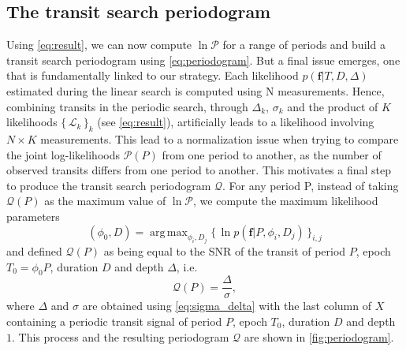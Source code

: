 \documentclass[modern]{aastex631}
\newcommand{\set}[1]{\{\,#1\,\}}
\DeclareMathOperator*{\argmax}{arg\,max}
\begin{document}
\subsection{The transit search periodogram}

Using \autoref{eq:result}, we can now compute $\ln\mathcal{P}$ for a range of periods and build a transit search periodogram using \autoref{eq:periodogram}. But a final issue emerges, one that is fundamentally linked to our strategy. Each likelihood $p(\bm{f} \vert T, D, \Delta)$ estimated during the linear search is computed using N measurements. Hence, combining transits in the periodic search, through $\Delta_k$, $\sigma_k$ and the product of $K$ likelihoods $\set{\mathcal{L}_k}_k$ (see \autoref{eq:result}), artificially leads to a likelihood involving $N\times K$ measurements. This lead to a normalization issue when trying to compare the joint log-likelihoods $\mathcal{P}(P)$ from one period to another, as the number of observed transits differs from one period to another. This motivates a final step to produce the transit search periodogram $\mathcal{Q}$. For any period P, instead of taking $ \mathcal{Q}(P)$ as the maximum value of $\ln\mathcal{P}$, we compute the maximum likelihood parameters
\begin{equation}\label{eq:phi0}
    (\phi_0 ,D) = \argmax_{\phi_i, D_j} \set{\ln p(\bm{f} \vert P, \phi_i, D_j)}_{i, j}
\end{equation}
and defined $\mathcal{Q}(P)$ as being equal to the SNR of the transit of period $P$, epoch $T_0 = \phi_0 P$, duration $D$ and depth $\Delta$, i.e.
\begin{equation*}
    \mathcal{Q}(P) = \frac{\Delta}{\sigma},
\end{equation*}
where $\Delta$ and $\sigma$ are obtained using \autoref{eq:sigma_delta} with the last column of $X$ containing a periodic transit signal of period $P$, epoch $T_0$, duration $D$ and depth $1$. This process and the resulting periodogram $\mathcal{Q}$ are shown in \autoref{fig:periodogram}.
\end{document}
